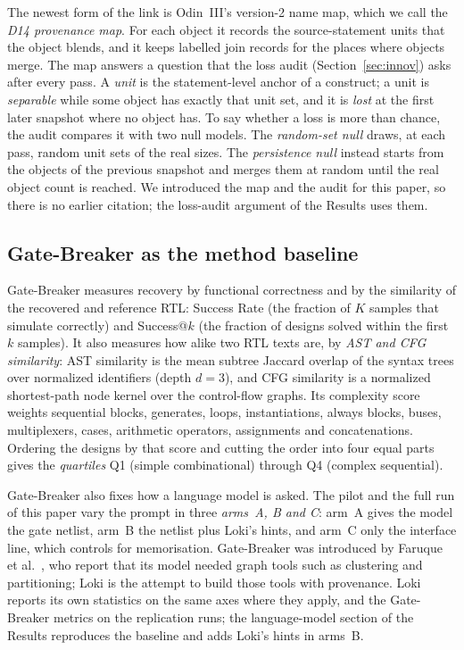 \documentclass[conference]{IEEEtran}
\begin{document}
The newest form of the link is Odin~III's version-2 name map, which we call the \emph{D14 provenance map}. %
For each object it records the source-statement units that the object blends, and it keeps labelled
join records for the places where objects merge. The map answers a question that the loss audit
(Section~\ref{sec:innov}) asks after every pass. A \emph{unit} is the statement-level anchor of a construct; %
a unit is \emph{separable} while some object has exactly that unit set, and it is \emph{lost} at the first
later snapshot where no object has. To say whether a loss is more than chance, the audit compares it with two
null models. The \emph{random-set null} draws, at each pass, random unit sets of the real sizes. %
The \emph{persistence null} instead starts from the objects of the previous snapshot and merges them at random
until the real object count is reached. We introduced the map and the audit for this paper, so there is no earlier citation; the loss-audit argument of the Results uses them.

\subsection{Gate-Breaker as the method baseline}

Gate-Breaker measures recovery by functional correctness and by the similarity of the
recovered and reference RTL: Success Rate (the fraction of $K$ samples that simulate
correctly) and Success@$k$ (the fraction of designs solved within the first $k$ samples).
It also measures how alike two RTL texts are, by \emph{AST and CFG similarity}: %
AST similarity is the mean subtree Jaccard overlap of the syntax trees over normalized identifiers
(depth $d=3$), and CFG similarity is a normalized shortest-path node kernel over the control-flow graphs.
Its complexity score weights sequential blocks, generates, loops, instantiations, always blocks, buses,
multiplexers, cases, arithmetic operators, assignments and concatenations. Ordering the designs by that score
and cutting the order into four equal parts gives the \emph{quartiles} %
Q1 (simple combinational) through Q4 (complex sequential).

Gate-Breaker also fixes how a language model is asked. The pilot and the full run of this paper vary the
prompt in three \emph{arms~A, B and C}: %
arm~A gives the model the gate netlist, arm~B the netlist plus Loki's hints, and arm~C only the interface line,
which controls for memorisation. Gate-Breaker was introduced by Faruque et al.~\cite{faruque2025gatebreaker}, who report that its model needed graph tools such as clustering and partitioning; Loki is the attempt to build those tools with provenance. Loki reports its own statistics on
the same axes where they apply, and the Gate-Breaker metrics on the replication runs; the language-model section of the Results reproduces the baseline and adds Loki's hints in arms~B.
\end{document}
